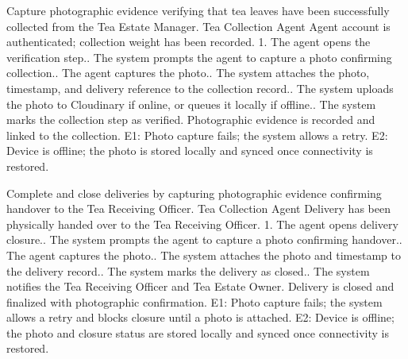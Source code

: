 {Capture photographic evidence verifying that tea leaves have been successfully collected from the Tea Estate Manager.}
{Tea Collection Agent}
{Agent account is authenticated; collection weight has been recorded.}
{1. The agent opens the verification step.. The system prompts the agent to capture a photo confirming collection.. The agent captures the photo.. The system attaches the photo, timestamp, and delivery reference to the collection record.. The system uploads the photo to Cloudinary if online, or queues it locally if offline.. The system marks the collection step as verified.}
{Photographic evidence is recorded and linked to the collection.}
{E1: Photo capture fails; the system allows a retry.\newline
E2: Device is offline; the photo is stored locally and synced once connectivity is restored.}

{Complete and close deliveries by capturing photographic evidence confirming handover to the Tea Receiving Officer.}
{Tea Collection Agent}
{Delivery has been physically handed over to the Tea Receiving Officer.}
{1. The agent opens delivery closure.. The system prompts the agent to capture a photo confirming handover.. The agent captures the photo.. The system attaches the photo and timestamp to the delivery record.. The system marks the delivery as closed.. The system notifies the Tea Receiving Officer and Tea Estate Owner.}
{Delivery is closed and finalized with photographic confirmation.}
{E1: Photo capture fails; the system allows a retry and blocks closure until a photo is attached.\newline
E2: Device is offline; the photo and closure status are stored locally and synced once connectivity is restored.}

